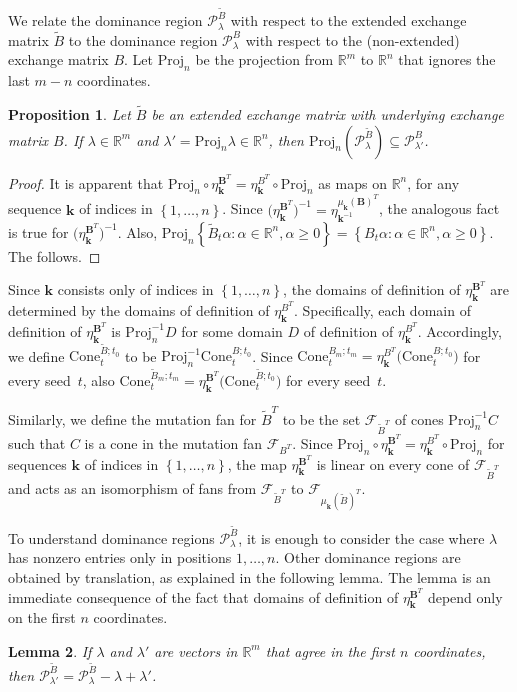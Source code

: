 \documentclass{amsart}
\newtheorem{proposition}{Proposition}[section]
\newtheorem{lemma}[proposition]{Lemma}
\theoremstyle{definition}
\theoremstyle{remark}
\numberwithin{equation}{section}
\newcommand{\reals}{\mathbb R}
\newcommand{\set}[1]{{\left\lbrace #1 \right\rbrace}}
\newcommand{\GG}{{\mathbf G}}
\newcommand{\F}{{\mathcal F}}
\newcommand{\0}{{\mathbf{0}}}
\newcommand{\Cone}{\mathrm{Cone}}
\newcommand{\Proj}{\mathrm{Proj}}
\newcommand{\kk}{\mathbf{k}}
\newcommand{\tB}{{\tilde{B}}}
\newcommand{\BB}{\mathbf{B}}
\renewcommand{\P}{\mathcal{P}}
\begin{document}
We relate the dominance region $\P_\lambda^\tB$ with respect to the extended exchange matrix $\tB$ to the dominance region $\P_\lambda^B$ with respect to the (non-extended) exchange matrix $B$.
Let $\Proj_n$ be the projection from $\reals^m$ to $\reals^n$ that ignores the last $m-n$ coordinates.

\begin{proposition}\label{contains proj}
Let $\tB$ be an extended exchange matrix with underlying exchange matrix $B$.
If $\lambda\in\reals^m$ and $\lambda'=\Proj_n\lambda\in\reals^n$, then $\Proj_n(\P_\lambda^\tB)\subseteq\P_{\lambda'}^B$.
\end{proposition}
\begin{proof}
It is apparent that $\Proj_n\circ\eta_\kk^{\BB^T}=\eta_\kk^{B^T}\circ\Proj_n$ as maps on $\reals^n$, for any sequence $\kk$ of indices in $\set{1,\ldots,n}$.
Since $\bigl(\eta_\kk^{\BB^T}\bigr)^{-1}=\eta_{\kk^{-1}}^{\mu_\kk(\BB)^T}$, the analogous fact is true for $\bigl(\eta_\kk^{\BB^T}\bigr)^{-1}$.
Also, $\Proj_n\set{\tB_t\alpha:\alpha\in\reals^n,\alpha\ge0}=\set{B_t\alpha:\alpha\in\reals^n,\alpha\ge0}$.
The  follows.
\end{proof}

Since $\kk$ consists only of indices in $\set{1,\ldots,n}$, the domains of definition of $\eta_\kk^{\BB^T}$ are determined by the domains of definition of $\eta_\kk^{B^T}$.
Specifically, each domain of definition of $\eta_\kk^{\BB^T}$ is $\Proj_n^{-1}D$ for some domain $D$ of definition of $\eta_\kk^{B^T}$.
Accordingly, we define $\Cone_t^{\tB;t_0}$ to be %
$\Proj_n^{-1}\Cone_t^{B;t_0}$.
Since $\Cone_t^{B_m;t_m}=\eta_\kk^{B^T}\bigl(\Cone_t^{B;t_0}\bigr)$ for every seed~$t$, also $\Cone_t^{\tB_m;t_m}=\eta_\kk^{\BB^T}\bigl(\Cone_t^{\tB;t_0}\bigr)$ for every seed~$t$.

Similarly, we define the mutation fan for $\tB^T$ to be the set $\F_{\tB^T}$ of cones $\Proj_n^{-1}C$ such that $C$ is a cone in the mutation fan $\F_{B^T}$.
Since $\Proj_n\circ\eta_\kk^{\BB^T}=\eta_\kk^{B^T}\circ\Proj_n$ for sequences $\kk$ of indices in $\set{1,\ldots,n}$, the map $\eta_\kk^{\BB^T}$ is linear on every cone of $\F_{\tB^T}$ and acts as an isomorphism of fans from $\F_{\tB^T}$ to $\F_{\mu_\kk(\tB)^T}$.

To understand dominance regions $\P^\tB_\lambda$, it is enough to consider the case where $\lambda$ has nonzero entries only in positions $1,\ldots,n$.
Other dominance regions are obtained by translation, as explained in the following lemma.
The lemma is an immediate consequence of the fact that domains of definition of $\eta_\kk^{\BB^T}$ depend only on the first $n$ coordinates.
\begin{lemma}\label{after all coefficients are just coefficients}
If $\lambda$ and $\lambda'$ are vectors in $\reals^m$ that agree in the first $n$ coordinates, then $\P^\tB_{\lambda'}=\P^\tB_\lambda-\lambda+\lambda'$.
\end{lemma}
\end{document}

